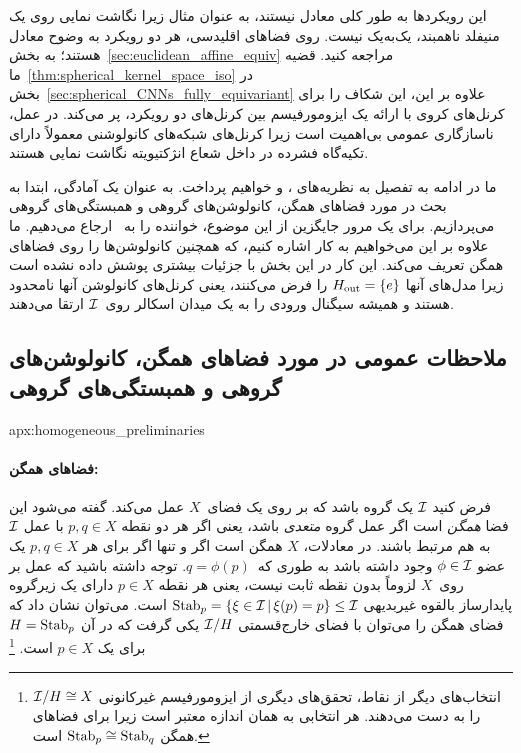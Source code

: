 \begin{itemize}
	این رویکردها به طور کلی معادل نیستند، به عنوان مثال زیرا نگاشت نمایی روی یک منیفلد ناهمبند، یک‌به‌یک نیست.
	روی فضاهای اقلیدسی، هر دو رویکرد به وضوح معادل هستند؛ به بخش~\ref{sec:euclidean_affine_equiv} مراجعه کنید.
	قضیه ما~\ref{thm:spherical_kernel_space_iso} در بخش~\ref{sec:spherical_CNNs_fully_equivariant} علاوه بر این، این شکاف را برای کرنل‌های کروی با ارائه یک ایزومورفیسم بین کرنل‌های دو رویکرد، پر می‌کند.
	در عمل، ناسازگاری عمومی بی‌اهمیت است زیرا کرنل‌های شبکه‌های کانولوشنی معمولاً دارای تکیه‌گاه فشرده در داخل شعاع انژکتیویته نگاشت نمایی هستند.
\end{itemize}

ما در ادامه به تفصیل به نظریه‌های
\citet{Kondor2018-GENERAL}، \citet{bekkers2020bspline} و \citet{Cohen2018-intertwiners}\cite{Cohen2019-generaltheory}
خواهیم پرداخت.
به عنوان یک آمادگی، ابتدا به بحث در مورد فضاهای همگن، کانولوشن‌های گروهی و همبستگی‌های گروهی می‌پردازیم.
برای یک مرور جایگزین از این موضوع، خواننده را به~\citet{esteves2020theoretical} ارجاع می‌دهیم.
ما علاوه بر این می‌خواهیم به کار \citet{chakraborty2018H-CNNs} اشاره کنیم، که همچنین کانولوشن‌ها را روی فضاهای همگن تعریف می‌کند.
این کار در این بخش با جزئیات بیشتری پوشش داده نشده است زیرا مدل‌های آنها $H_{\textup{out}}=\{e\}$ را فرض می‌کنند، یعنی کرنل‌های کانولوشن آنها نامحدود هستند و همیشه سیگنال ورودی را به یک میدان اسکالر روی~$\mathcal{I}$ ارتقا می‌دهند.






\toclesslab\subsection{ملاحظات عمومی در مورد فضاهای همگن، کانولوشن‌های گروهی و همبستگی‌های گروهی}{apx:homogeneous_preliminaries}

\paragraph{فضاهای همگن:}
فرض کنید $\mathcal{I}$ یک گروه باشد که بر روی یک فضای~$X$ عمل می‌کند.
گفته می‌شود این فضا \emph{همگن} است اگر عمل گروه \emph{متعدی} باشد، یعنی اگر هر دو نقطه $p,q\in X$ با عمل $\mathcal{I}$ به هم مرتبط باشند.
در معادلات، $X$ همگن است اگر و تنها اگر برای هر $p,q\in X$ یک عضو $\phi\in\mathcal{I}$ وجود داشته باشد به طوری که~$q=\phi(p)$.
توجه داشته باشید که عمل بر روی~$X$ لزوماً بدون نقطه ثابت نیست، یعنی هر نقطه $p\in X$ دارای یک زیرگروه پایدارساز بالقوه غیربدیهی $\operatorname{Stab}_{p} = {\{\xi\in\mathcal{I} \,|\, \xi(p)=p \}} \leq\mathcal{I}$ است.
می‌توان نشان داد که فضای همگن را می‌توان با فضای خارج‌قسمتی $\mathcal{I}/H$ یکی گرفت که در آن $H = \operatorname{Stab}_{p}$ برای یک $p\in X$ است.%
\footnote{
	انتخاب‌های دیگر از نقاط، تحقق‌های دیگری از ایزومورفیسم غیرکانونی $\mathcal{I}/H \cong X$ را به دست می‌دهند.
	هر انتخابی به همان اندازه معتبر است زیرا برای فضاهای همگن $\operatorname{Stab}_{p} \cong \operatorname{Stab}_{q}$ است.
}

